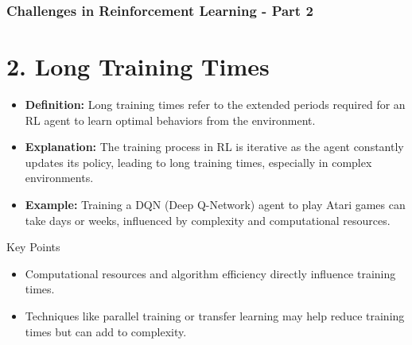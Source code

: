 \documentclass[aspectratio=169]{beamer}
\begin{document}
\begin{frame}[fragile]
    \frametitle{Challenges in Reinforcement Learning - Part 2}
    \section*{2. Long Training Times}
    \begin{itemize}
        \item \textbf{Definition:} Long training times refer to the extended periods required for an RL agent to learn optimal behaviors from the environment.
        \item \textbf{Explanation:} The training process in RL is iterative as the agent constantly updates its policy, leading to long training times, especially in complex environments.
        \item \textbf{Example:} Training a DQN (Deep Q-Network) agent to play Atari games can take days or weeks, influenced by complexity and computational resources.
    \end{itemize}

    \begin{block}{Key Points}
        \begin{itemize}
            \item Computational resources and algorithm efficiency directly influence training times.
            \item Techniques like parallel training or transfer learning may help reduce training times but can add to complexity.
        \end{itemize}
    \end{block}
\end{frame}
\end{document}
